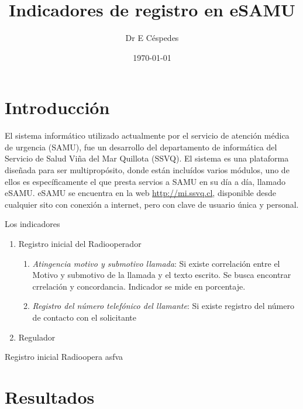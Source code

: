 \documentclass{article}
\title{Indicadores de registro en eSAMU}
\author[1]{Dr E Céspedes}
\affil[1]{Tecnologías SAMU Viña del Mar}
\date{\today}
\begin{document}
\maketitle


\tableofcontents

\section{Introducción}
El sistema informático utilizado actualmente por el servicio de atención médica de urgencia (SAMU), fue un desarrollo del departamento de informática del Servicio de Salud Viña del Mar Quillota (SSVQ). El sistema es una plataforma diseñada para ser multipropósito, donde están incluídos varios módulos, uno de ellos es específicamente el que presta servios a SAMU en su día a día, llamado eSAMU. eSAMU se encuentra en la web  \url{http://mi.ssvq.cl}, disponible desde cualquier sito con conexión a internet, pero con clave de usuario única y personal.


Los indicadores
\begin{enumerate}

\item Registro inicial del Radiooperador
	\begin{enumerate}
	\item \emph{Atingencia motivo y submotivo llamada}: Si existe correlación entre el Motivo y submotivo de la llamada y el texto escrito. Se busca encontrar crrelación y concordancia. Indicador se mide en porcentaje.
	
	\item \emph{Registro del número telefónico del llamante}: Si existe registro del número de contacto con el solicitante

	\end{enumerate}
\item Regulador

\end{enumerate}
Registro inicial Radioopera
asfva



\section{Resultados}


\end{document}
